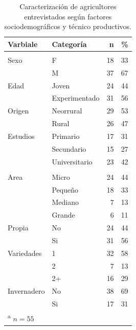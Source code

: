 \documentclass[a4paper, nobind]{templates/ociamthesis}
\begin{document}
\begin{table}

\caption[Caracterización de los entrevistados]{\label{tab:tabla-caracterizacion}Caracterización de agricultores entrevistados según factores sociodemográficos y técnico productivos.}
\centering
\begin{tabular}[t]{llrr}
\toprule
\textbf{Varbiale} & \textbf{Categoría} & \textbf{n} & \textbf{\%}\\
\midrule
\addlinespace[0.3em]
\multicolumn{4}{l}{\textbf{Sociodemográficos}}\\
\hline
\hspace{1em}Sexo & F & 18 & 33\\
\hspace{1em} & M & 37 & 67\\
\midrule
\hspace{1em}Edad & Joven & 24 & 44\\
\hspace{1em} & Experimentado & 31 & 56\\
\midrule
\hspace{1em}Origen & Neorrural & 29 & 53\\
\hspace{1em} & Rural & 26 & 47\\
\midrule
\hspace{1em}Estudios & Primario & 17 & 31\\
\hspace{1em} & Secundario & 15 & 27\\
\hspace{1em} & Universitario & 23 & 42\\
\midrule
\addlinespace[0.3em]
\multicolumn{4}{l}{\textbf{Técnicos productivos}}\\
\hline
\hspace{1em}Area & Micro & 24 & 44\\
\hspace{1em} & Pequeño & 18 & 33\\
\hspace{1em} & Mediano & 7 & 13\\
\hspace{1em} & Grande & 6 & 11\\
\midrule
\hspace{1em}Propia & No & 24 & 44\\
\hspace{1em} & Si & 31 & 56\\
\midrule
\hspace{1em}Variedades & 1 & 32 & 58\\
\hspace{1em} & 2 & 7 & 13\\
\hspace{1em} & 2+ & 16 & 29\\
\midrule
\hspace{1em}Invernadero & No & 38 & 69\\
\hspace{1em} & Si & 17 & 31\\
\bottomrule
\multicolumn{4}{l}{\textsuperscript{a} $n=55$}\\
\end{tabular}
\end{table}
\end{document}
